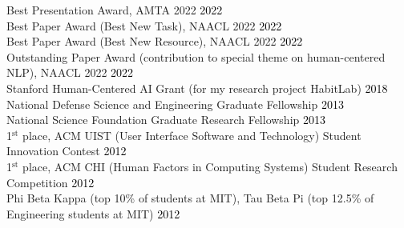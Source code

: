 {}

Best Presentation Award, AMTA 2022 \hfill \textcolor{black}{2022}\\ %
Best Paper Award (Best New Task), NAACL 2022 \hfill \textcolor{black}{2022}\\ %
Best Paper Award (Best New Resource), NAACL 2022 \hfill \textcolor{black}{2022}\\ %
Outstanding Paper Award (contribution to special theme on human-centered NLP), NAACL 2022 \hfill \textcolor{black}{2022}\\ %
Stanford Human-Centered AI Grant (for my research project HabitLab) \hfill \textcolor{black}{2018}\\ %
National Defense Science and Engineering Graduate Fellowship \hfill \textcolor{black}{2013}\\ %
National Science Foundation Graduate Research Fellowship \hfill \textcolor{black}{2013}\\ %
1$^{\textrm{st}}$ place, ACM UIST (User Interface Software and Technology) Student Innovation Contest \hfill \textcolor{black}{2012}\\
1$^{\textrm{st}}$ place, ACM CHI (Human Factors in Computing Systems) Student Research Competition \hfill \textcolor{black}{2012}\\
Phi Beta Kappa (top 10\% of students at MIT), Tau Beta Pi (top 12.5\% of Engineering students at MIT) \hfill \textcolor{black}{2012}\\
